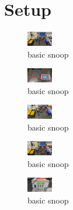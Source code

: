 \section{Setup}
\label{sec:setup}

\begin{figure}[H]
    \centering
    \includegraphics[width=0.1\textwidth]{graphics/basic-setup.jpg}
    \caption{basic snoop}
    \label{fig:setup:basic}
\end{figure}

\begin{figure}[H]
    \centering
    \includegraphics[width=0.1\textwidth]{graphics/source-characterization.jpg}
    \caption{basic snoop}
    \label{fig:setup:source-characterization}
\end{figure}

\begin{figure}[H]
    \centering
    \includegraphics[width=0.1\textwidth]{graphics/shg-setup.jpg}
    \caption{basic snoop}
    \label{fig:setup:shg}
\end{figure}

\begin{figure}[H]
    \centering
    \includegraphics[width=0.1\textwidth]{graphics/iodine.jpg}
    \caption{basic snoop}
    \label{fig:setup:iodine}
\end{figure}

\begin{figure}[H]
    \centering
    \includegraphics[width=0.1\textwidth]{graphics/temperature-controller.jpg}
    \caption{basic snoop}
    \label{fig:setup:temperature-controller}
\end{figure}